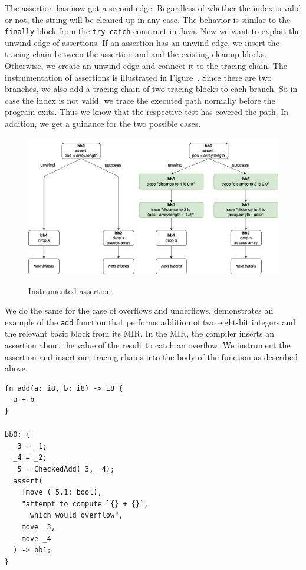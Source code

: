 \documentclass[paper=a4,%
  twoside,%
  BCOR4mm,%
  abstract=true,%
  toc=bibliography,%
  chapterprefix=true,%
  toc=bibliographynumbered,%
  open=right,%
  english,%
  pagesize=pdftex]{scrreprt}
\begin{document}
The assertion has now got a second edge. Regardless of whether the index is valid or not, the string will be cleaned up in any case. The behavior is similar to the \lstinline{finally} block from the \lstinline{try-catch} construct in Java. Now we want to exploit the unwind edge of assertions. If an assertion has an unwind edge, we insert the tracing chain between the assertion and and the existing cleanup blocks. Otherwise, we create an unwind edge and connect it to the tracing chain. The instrumentation of assertions is illustrated in Figure~. Since there are two branches, we also add a tracing chain of two tracing blocks to each branch. So in case the index is not valid, we trace the executed path normally before the program exits. Thus we know that the respective test has covered the path. In addition, we get a guidance for the two possible cases.

\begin{figure}[h]
\caption{Instrumented assertion}
\centering
\includegraphics[width=\textwidth]{comparison-instrumented-assertion}
\label{fig:comparison-instrumented-assertion}
\end{figure}

We do the same for the case of overflows and underflows.  demonstrates an example of the \lstinline{add} function that performs addition of two eight-bit integers and the relevant basic block from its \ac{MIR}. In the \ac{MIR}, the compiler inserts an assertion about the value of the result to catch an overflow. We instrument the assertion and insert our tracing chains into the body of the function as described above.
\begin{lstlisting}[language={}, style=boxed, caption={\ac{MIR} overflow check}, label=lst:mir-overflow-check]
fn add(a: i8, b: i8) -> i8 {
  a + b
}

bb0: {
  _3 = _1;
  _4 = _2;
  _5 = CheckedAdd(_3, _4);
  assert(
    !move (_5.1: bool),
    "attempt to compute `{} + {}`,
      which would overflow",
    move _3,
    move _4
  ) -> bb1;
}
\end{lstlisting}
\end{document}
